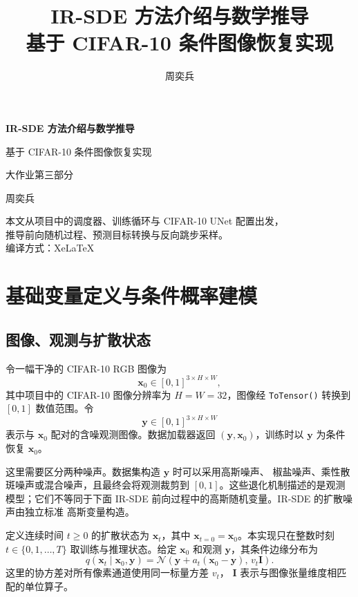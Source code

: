 \documentclass[UTF8,a4paper,12pt]{ctexart}
\title{\textbf{IR-SDE 方法介绍与数学推导}\\[0.6em]
\large 基于 CIFAR-10 条件图像恢复实现}
\author{周奕兵}
\date{}
\begin{document}
\begin{titlepage}
  \centering
  \vspace*{3cm}
  {\Huge\bfseries IR-SDE 方法介绍与数学推导\par}
  \vspace{1.2cm}
  {\Large 基于 CIFAR-10 条件图像恢复实现\par}
  \vspace{2.2cm}
  {\large 大作业第三部分\par}
  \vspace{0.6cm}
  {\Large 周奕兵\par}
  \vfill
  {\large
    本文从项目中的调度器、训练循环与 CIFAR-10 UNet 配置出发，\\
    推导前向随机过程、预测目标转换与反向跳步采样。\\[0.8em]
    编译方式：XeLaTeX
  \par}
  \vspace*{1.5cm}
\end{titlepage}

\tableofcontents
\clearpage

\section{基础变量定义与条件概率建模}

\subsection{图像、观测与扩散状态}

令一幅干净的 CIFAR-10 RGB 图像为
\[
  \bm{x}_0 \in [0,1]^{3\times H\times W},
\]
其中项目中的 CIFAR-10 图像分辨率为 \(H=W=32\)，图像经
\texttt{ToTensor()} 转换到 \([0,1]\) 数值范围。令
\[
  \bm{y}\in[0,1]^{3\times H\times W}
\]
表示与 \(\bm{x}_0\) 配对的含噪观测图像。数据加载器返回
\((\bm{y},\bm{x}_0)\)，训练时以 \(\bm{y}\) 为条件恢复 \(\bm{x}_0\)。

这里需要区分两种噪声。数据集构造 \(\bm{y}\) 时可以采用高斯噪声、
椒盐噪声、乘性散斑噪声或混合噪声，且最终会将观测裁剪到
\([0,1]\)。这些退化机制描述的是观测模型；它们不等同于下面
IR-SDE 前向过程中的高斯随机变量。IR-SDE 的扩散噪声由独立标准
高斯变量构造。

定义连续时间 \(t\geq 0\) 的扩散状态为 \(\bm{x}_t\)，其中
\(\bm{x}_{t=0}=\bm{x}_0\)。本实现只在整数时刻
\(t\in\{0,1,\ldots,T\}\) 取训练与推理状态。给定 \(\bm{x}_0\)
和观测 \(\bm{y}\)，其条件边缘分布为
\[
  q(\bm{x}_t\mid \bm{x}_0,\bm{y})
  =
  \mathcal{N}\!\left(
    \bm{y}+a_t(\bm{x}_0-\bm{y}),\,
    v_t\bm{I}
  \right).
\]
这里的协方差对所有像素通道使用同一标量方差 \(v_t\)，
\(\bm{I}\) 表示与图像张量维度相匹配的单位算子。
\end{document}
